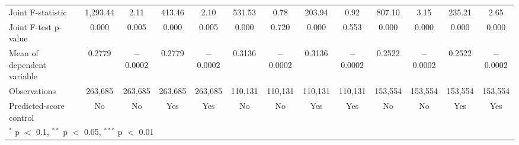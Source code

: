\begin{tabular}{lcccccccccccc}
\midrule
Joint F-statistic & 1,293.44 & 2.11 & 413.46 & 2.10 & 531.53 & 0.78 & 203.94 & 0.92 & 807.10 & 3.15 & 235.21 & 2.65 \\
Joint F-test p-value & 0.000 & 0.005 & 0.000 & 0.005 & 0.000 & 0.720 & 0.000 & 0.553 & 0.000 & 0.000 & 0.000 & 0.000 \\
Mean of dependent variable & 0.2779 & $-$0.0002 & 0.2779 & $-$0.0002 & 0.3136 & $-$0.0002 & 0.3136 & $-$0.0002 & 0.2522 & $-$0.0002 & 0.2522 & $-$0.0002 \\
Observations & 263,685 & 263,685 & 263,685 & 263,685 & 110,131 & 110,131 & 110,131 & 110,131 & 153,554 & 153,554 & 153,554 & 153,554 \\
Predicted-score control & No & No & Yes & Yes & No & No & Yes & Yes & No & No & Yes & Yes \\
\bottomrule
\multicolumn{13}{l}{\footnotesize $^{*}$ p $<$ 0.1, $^{**}$ p $<$ 0.05, $^{***}$ p $<$ 0.01} \\
\end{tabular}
